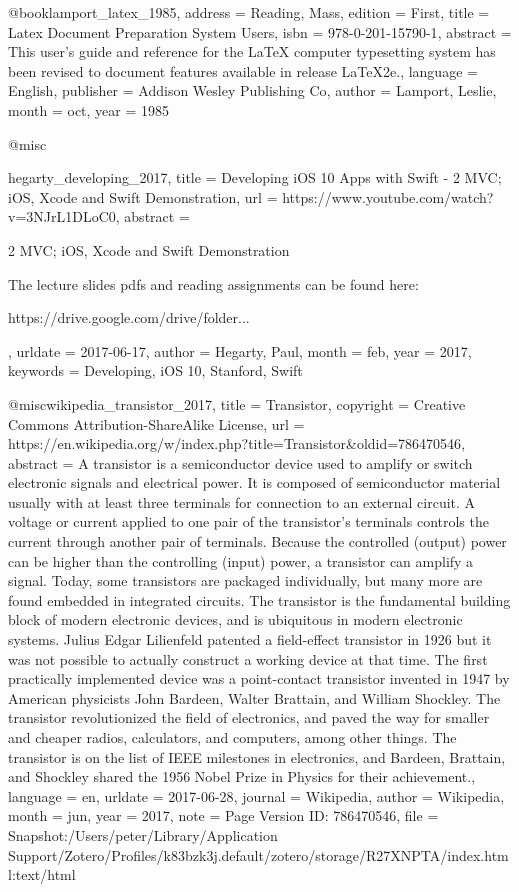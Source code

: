 {{@book{lamport_latex_1985,
  address   = {Reading, Mass},
  edition   = {First},
  title     = {Latex {Document} {Preparation} {System} {Users}},
  isbn      = {978-0-201-15790-1},
  abstract  = {This user's guide and reference for the LaTeX computer typesetting system has been revised to document features available in release LaTeX2e.},
  language  = {English},
  publisher = {Addison Wesley Publishing Co},
  author    = {Lamport, Leslie},
  month     = oct,
  year      = {1985}
}

@misc{hegarty_developing_2017,
  title    = {Developing {iOS} 10 {Apps} with {Swift} - 2  {MVC}; {iOS}, {Xcode} and {Swift} {Demonstration}},
  url      = {https://www.youtube.com/watch?v=3NJrL1DLoC0},
  abstract = {2  MVC; iOS, Xcode and Swift Demonstration

The lecture slides pdfs and reading assignments can be found here:

https://drive.google.com/drive/folder...},
  urldate  = {2017-06-17},
  author   = {Hegarty, Paul},
  month    = feb,
  year     = {2017},
  keywords = {Developing, iOS 10, Stanford, Swift}
}

@misc{wikipedia_transistor_2017,
  title     = {Transistor},
  copyright = {Creative Commons Attribution-ShareAlike License},
  url       = {https://en.wikipedia.org/w/index.php?title=Transistor&oldid=786470546},
  abstract  = {A transistor is a semiconductor device used to amplify or switch electronic signals and electrical power. It is composed of semiconductor material usually with at least three terminals for connection to an external circuit. A voltage or current applied to one pair of the transistor's terminals controls the current through another pair of terminals. Because the controlled (output) power can be higher than the controlling (input) power, a transistor can amplify a signal. Today, some transistors are packaged individually, but many more are found embedded in integrated circuits.
The transistor is the fundamental building block of modern electronic devices, and is ubiquitous in modern electronic systems. Julius Edgar Lilienfeld patented a field-effect transistor in 1926 but it was not possible to actually construct a working device at that time. The first practically implemented device was a point-contact transistor invented in 1947 by American physicists John Bardeen, Walter Brattain, and William Shockley. The transistor revolutionized the field of electronics, and paved the way for smaller and cheaper radios, calculators, and computers, among other things. The transistor is on the list of IEEE milestones in electronics, and Bardeen, Brattain, and Shockley shared the 1956 Nobel Prize in Physics for their achievement.},
  language  = {en},
  urldate   = {2017-06-28},
  journal   = {Wikipedia},
  author    = {{Wikipedia}},
  month     = jun,
  year      = {2017},
  note      = {Page Version ID: 786470546},
  file      = {Snapshot:/Users/peter/Library/Application Support/Zotero/Profiles/k83bzk3j.default/zotero/storage/R27XNPTA/index.html:text/html}
}

}}
